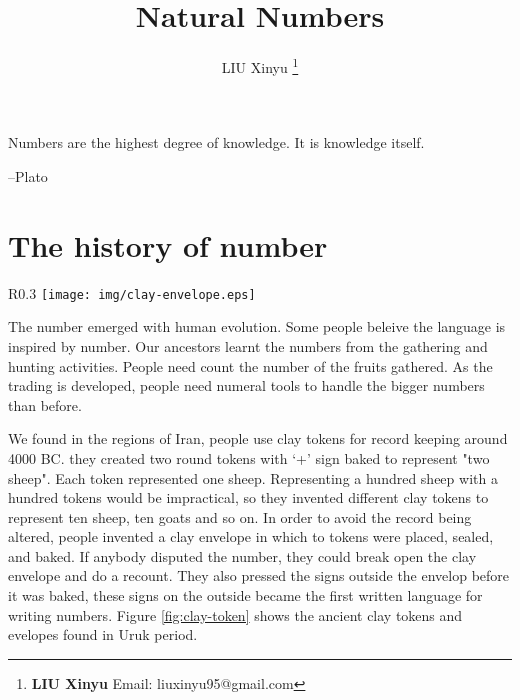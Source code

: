 \documentclass[UTF8]{article}
\begin{document}

\title{Natural Numbers}

\author{LIU Xinyu
\thanks{{\bfseries LIU Xinyu} \newline
  Email: liuxinyu95@gmail.com \newline}
  }

\maketitle
\fi


\epigraph{Numbers are the highest degree of knowledge. It is knowledge itself.}{--Plato}

\section{The history of number}

\begin{wrapfigure}{R}{0.3\textwidth}
 \centering
 \texttt{[image: img/clay-envelope.eps]}
 \caption{The envelop of tokens in Uruk period from Susa. Louvre Museum}
 \label{fig:clay-token}
\end{wrapfigure}

The number emerged with human evolution. Some people beleive the language is inspired by number. Our ancestors learnt the numbers from the gathering and hunting activities. People need count the number of the fruits gathered. As the trading is developed, people need numeral tools to handle the bigger numbers than before.

We found in the regions of Iran, people use clay tokens for record keeping around 4000 BC. they created two round tokens with `+' sign baked to represent "two sheep". Each token represented one sheep. Representing a hundred sheep with a hundred tokens would be impractical, so they invented different clay tokens to represent ten sheep, ten goats and so on. In order to avoid the record being altered, people invented a clay envelope in which to tokens were placed, sealed, and baked. If anybody disputed the number, they could break open the clay envelope and do a recount. They also pressed the signs outside the envelop before it was baked, these signs on the outside became the first written language for writing numbers\cite{trip-to-number-kindom}. Figure \ref{fig:clay-token} shows the ancient clay tokens and evelopes found in Uruk period.
\end{document}
